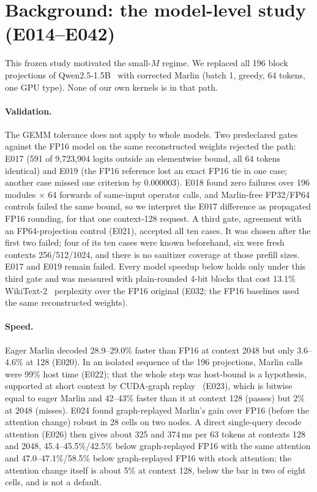 \documentclass[sigconf,nonacm]{acmart}
\begin{document}
\section{Background: the model-level study (E014--E042)}
\label{sec:model}
This frozen study motivated the small-$M$ regime. We replaced all 196 block projections of Qwen2.5-1.5B~\cite{qwen25} with corrected Marlin (batch 1, greedy, 64 tokens, one GPU type). None of our own kernels is in that path.

\paragraph{Validation.} The GEMM tolerance does not apply to whole models. Two predeclared gates against the FP16 model on the same reconstructed weights rejected the path: E017 (591 of 9,723,904 logits outside an elementwise bound, all 64 tokens identical) and E019 (the FP16 reference lost an exact FP16 tie in one case; another case missed one criterion by 0.000003). E018 found zero failures over 196 modules $\times$ 64 forwards of same-input operator calls, and Marlin-free FP32/FP64 controls failed the same bound, so we interpret the E017 difference as propagated FP16 rounding, for that one context-128 request. A third gate, agreement with an FP64-projection control (E021), accepted all ten cases. It was chosen after the first two failed; four of its ten cases were known beforehand, six were fresh contexts 256/512/1024, and there is no sanitizer coverage at those prefill sizes. E017 and E019 remain failed. Every model speedup below holds only under this third gate and was measured with plain-rounded 4-bit blocks that cost 13.1\% WikiText-2~\cite{wikitext} perplexity over the FP16 original (E032; the FP16 baselines used the same reconstructed weights).

\paragraph{Speed.} Eager Marlin decoded 28.9--29.0\% faster than FP16 at context 2048 but only 3.6--4.6\% at 128 (E020). In an isolated sequence of the 196 projections, Marlin calls were 99\% host time (E022); that the whole step was host-bound is a hypothesis, supported at short context by CUDA-graph replay~\cite{cudagraphs} (E023), which is bitwise equal to eager Marlin and 42--43\% faster than it at context 128 (passes) but 2\% at 2048 (misses). E024 found graph-replayed Marlin's gain over FP16 (before the attention change) robust in 28 cells on two nodes. A direct single-query decode attention (E026) then gives about 325 and 374\,ms per 63 tokens at contexts 128 and 2048, 45.4--45.5\%/42.5\% below graph-replayed FP16 with the same attention and 47.0--47.1\%/58.5\% below graph-replayed FP16 with stock attention; the attention change itself is about 5\% at context 128, below the bar in two of eight cells, and is not a default.
\end{document}
